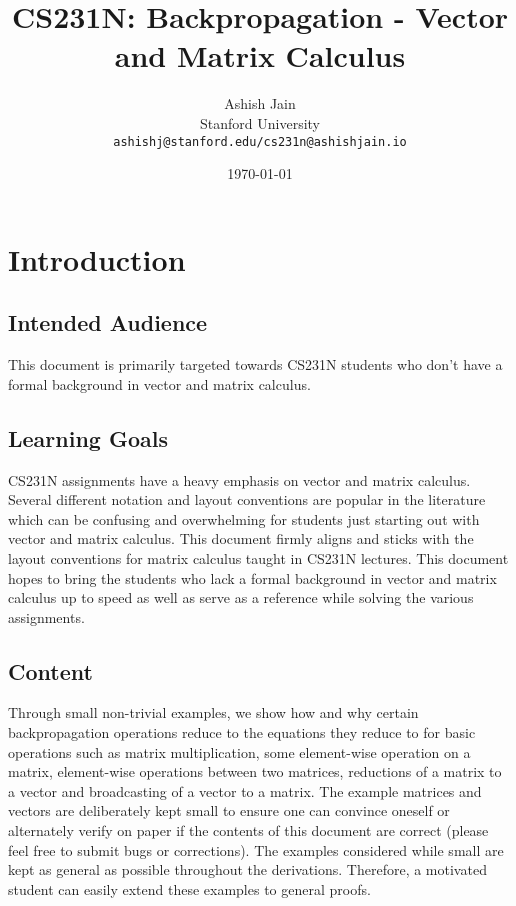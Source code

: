\documentclass{article}
\title{CS231N: Backpropagation - Vector and Matrix Calculus}
\author{
  Ashish Jain \\
  Stanford University \\
  \texttt{ashishj@stanford.edu/cs231n@ashishjain.io}
 }
\date{\today}
\begin{document}
\pagestyle{empty}
\maketitle

\tableofcontents

\newpage
\pagestyle{fancy}
\section{Introduction}
\subsection{Intended Audience}
This document is primarily targeted towards CS231N students who don't have a formal background in vector and matrix calculus.

\subsection{Learning Goals}
CS231N assignments have a heavy emphasis on vector and matrix calculus. Several different notation and layout conventions are popular in the literature which can be confusing and overwhelming for students just starting out with vector and matrix calculus. This document firmly aligns and sticks with the layout conventions for matrix calculus taught in CS231N lectures. This document hopes to bring the students who lack a formal background in vector and matrix calculus up to speed as well as serve as a reference while solving the various assignments. 

\subsection{Content}
Through small non-trivial examples, we show how and why certain backpropagation operations reduce to the equations they reduce to for basic operations such as matrix multiplication, some element-wise operation on a matrix, element-wise operations between two matrices, reductions of a matrix to a vector and broadcasting of a vector to a matrix. The example matrices and vectors are deliberately kept small to ensure one can convince oneself or alternately verify on paper if the contents of this document are correct (please feel free to submit bugs or corrections). The examples considered while small are kept as general as possible throughout the derivations. Therefore, a motivated student can easily extend these examples to general proofs.
\end{document}
